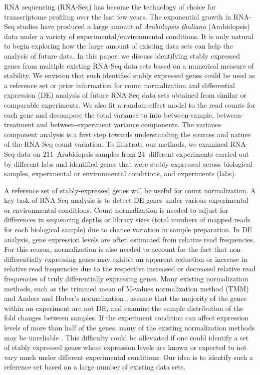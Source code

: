 \documentclass[letterpaper,12pt]{article}
\newcommand{\howmanySamples}{211~}
\newcommand{\howmanylab}{24~}
\begin{document}
RNA sequencing (RNA-Seq) has become the technology of choice for transcriptome
profiling over the last few years. The exponential growth in RNA-Seq studies have
produced a large amount of \textit{Arabidopsis thaliana} (Arabidopsis) data under a variety of 
experimental/environmental conditions.  It is only natural to begin exploring
how the large amount of existing data sets can help the analysis of future
data.  In this paper, we discuss identifying stably expressed genes from
multiple existing RNA-Seq data sets based on a numerical measure of stability.
We envision that such identified stably expressed genes could be used as a
reference set or prior information for count normalization and differential
expression (DE) analysis of future RNA-Seq data sets obtained from similar or
comparable experiments.  We also fit a random-effect model to the read counts
for each gene and decompose the total variance to into between-sample,
between-treatment and between-experiment variance components. The variance component
analysis is a first step towards understanding the sources and nature of the
RNA-Seq count variation.  To illustrate our methods, we examined RNA-Seq data
on \howmanySamples Arabidopsis  samples from \howmanylab different experiments carried out by
different labs and identified genes that were stably expressed across
biological samples, experimental or environmental conditions, and experiments
(labs).  

A reference set of stably-expressed genes will be useful for count
normalization.  A key task of RNA-Seq analysis is to detect DE genes under
various experimental or environmental conditions. Count normalization is
needed to adjust for differences in sequencing depths or library sizes (total
numbers of mapped reads for each biological sample) due to chance variation in
sample preparation.  In DE analysis, gene expression levels are often
estimated from relative read frequencies. For this reason, normalization is also 
needed to account for the fact that non-differentially expressing genes may exhibit
an apparent reduction or increase in relative read frequencies due to the respective 
increased or decreased relative read frequencies of truly differentially expressing genes.
Many existing normalization methods, such as the trimmed
mean of M-values normalization method (TMM) \citep{robinson2010scaling} and
Anders and Huber's normalization \citep{anders2010differential}, assume that the
majority of the genes within an experiment are not DE, and examine the sample
distribution of the fold changes between samples.
If the experiment condition can affect expression levels of more than half of
the genes, many of the existing normalization methods may be unreliable
\citep{loven2012revisiting, wu2013use}.  This difficulty could be
alleviated if one could identify a set of stably expressed genes whose
expression levels are known or expected to not vary much under different
experimental conditions. Our idea is to identify such a reference set based on
a large number of existing data sets.
\end{document}
